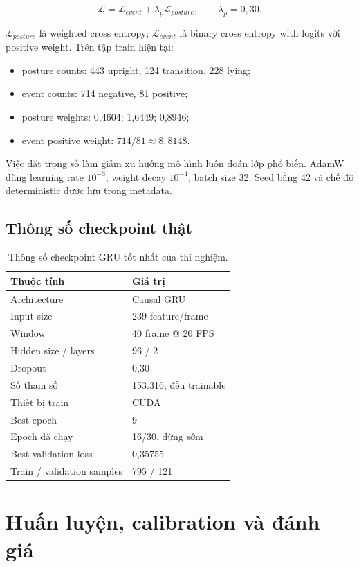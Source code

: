 \documentclass[12pt,a4paper,oneside]{report}
\begin{document}
\[
\mathcal{L}=\mathcal{L}_{event}+\lambda_p\mathcal{L}_{posture},
\qquad \lambda_p=0,30.
\]

$\mathcal{L}_{posture}$ là weighted cross entropy; $\mathcal{L}_{event}$ là
binary cross entropy with logits với positive weight. Trên tập train hiện tại:

\begin{itemize}
  \item posture counts: 443 upright, 124 transition, 228 lying;
  \item event counts: 714 negative, 81 positive;
  \item posture weights: 0,4604; 1,6449; 0,8946;
  \item event positive weight: $714/81\approx8,8148$.
\end{itemize}

Việc đặt trọng số làm giảm xu hướng mô hình luôn đoán lớp phổ biến. AdamW dùng
learning rate $10^{-3}$, weight decay $10^{-4}$, batch size 32. Seed bằng 42 và
chế độ deterministic được lưu trong metadata.

\section{Thông số checkpoint thật}

\begin{table}[H]
\centering
\caption{Thông số checkpoint GRU tốt nhất của thí nghiệm.}
\begin{tabularx}{\textwidth}{p{5.4cm}Y}
\toprule
Thuộc tính & Giá trị \\
\midrule
Architecture & Causal GRU \\
Input size & 239 feature/frame \\
Window & 40 frame @ 20 FPS \\
Hidden size / layers & 96 / 2 \\
Dropout & 0,30 \\
Số tham số & 153.316, đều trainable \\
Thiết bị train & CUDA \\
Best epoch & 9 \\
Epoch đã chạy & 16/30, dừng sớm \\
Best validation loss & 0,35755 \\
Train / validation samples & 795 / 121 \\
\bottomrule
\end{tabularx}
\end{table}

\chapter{Huấn luyện, calibration và đánh giá}
\end{document}
